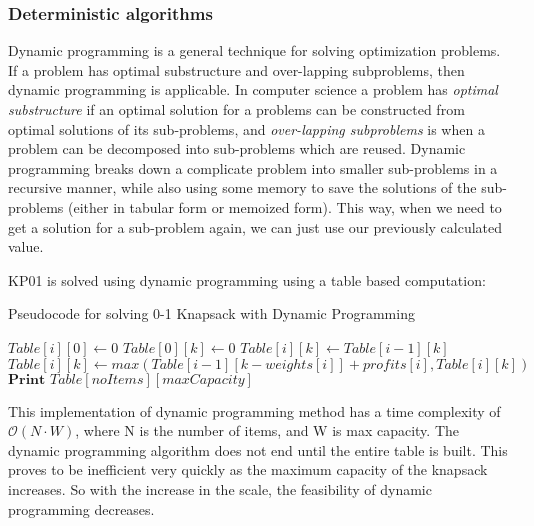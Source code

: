 \documentclass[titlepage]{article}
\begin{document}
\subsubsection*{Deterministic algorithms}
Dynamic programming is a general technique for solving optimization problems. If a problem has optimal substructure and over-lapping subproblems, then dynamic programming is applicable. In computer science 
a problem has \emph{optimal substructure} if an optimal solution for a problems can be constructed from optimal solutions of its sub-problems, and \emph{over-lapping subproblems} is when a problem can be decomposed into sub-problems which are reused. Dynamic programming breaks down a complicate problem into smaller sub-problems in a recursive manner, while also using some memory to save the solutions of the sub-problems (either in tabular form or memoized form). This way, when we need to get a solution for a sub-problem again, we can just use our previously calculated value. 

KP01 is solved using dynamic programming using a table based computation:

\begin{algorithm}
\caption{Pseudocode for solving 0-1 Knapsack with Dynamic Programming}\label{dp}
    \begin{algorithmic}
         
            \State $Table[i][0] \gets 0 $ 
        \EndFor
         
            \State $Table[0][k] \gets 0 $
        \EndFor
                \State $Table[i][k] \gets Table[i-1][k]$  
                    \State $Table[i][k] \gets max(Table[i-1][k-weights[i]] + profits[i], Table[i][k]) $
                \EndIf
            \EndFor
        \EndFor
        \State $\textbf{Print } Table[noItems][maxCapacity] $
    \end{algorithmic}
\end{algorithm}

This implementation of dynamic programming method has a time complexity of $\mathcal{O}(N\cdot W)$, where N is the number of items, and W is max capacity. The dynamic programming algorithm does not end until the entire table is built. This proves to be inefficient very quickly as the maximum capacity of the knapsack increases. So with the increase in the scale, the feasibility of dynamic programming decreases.
\end{document}
